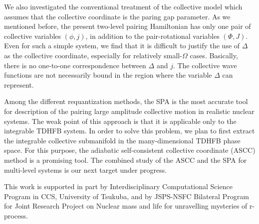 \documentclass[%
superscriptaddress,
preprint,
showpacs,
nofootinbib,
amsmath,amssymb,
aps,
prc,
floatfix ]%
{revtex4-1}
\begin{document}
We also investigated the conventional treatment of
the collective model which assumes that the collective coordinate is
the paring gap parameter.
As we mentioned before, the present two-level pairing Hamiltonian has
only one pair of collective variables $(\phi,j)$, in addition to the
pair-rotational variables $(\Phi,J)$.
Even for such a simple system, we find that it is difficult to justify
the use of $\Delta$ as the collective coordinate,
especially for relatively small-$\Omega$ cases.
Basically, there is no one-to-one correspondence between $\Delta$ and $j$.
The collective wave functions are not necessarily bound in the region
where the variable $\Delta$ can represent.


Among the different requantization methods,
the SPA is the most accurate tool for description of
the pairing large amplitude collective motion in realistic nuclear systems.
The weak point of this approach is that it is applicable only to the
integrable TDHFB system.
In order to solve this problem, we plan to first extract the
integrable collective submanifold in the many-dimensional TDHFB phase space.
For this purpose, the adiabatic self-consistent collective coordinate (ASCC)
method \cite{NMMY16} is a promising tool.
The combined study of the ASCC and the SPA for multi-level systems is our
next target under progress.

\begin{acknowledgments}
This work is supported in part
by Interdisciplinary Computational Science Program in CCS,
University of Tsukuba,
and
by JSPS-NSFC Bilateral Program for Joint Research Project
on Nuclear mass and life for unravelling mysteries of r-process.
\end{acknowledgments}
\end{document}
